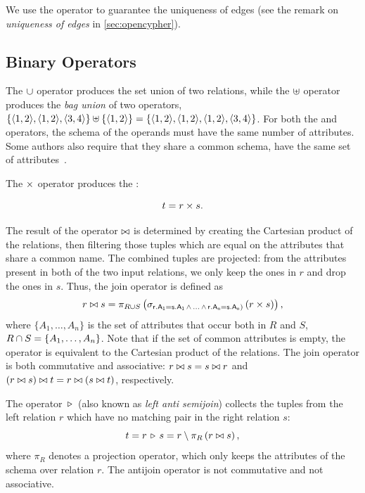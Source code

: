 We use the \alldifferenttext operator to guarantee the uniqueness of edges (see the remark on \emph{uniqueness of edges} in \autoref{sec:opencypher}).

\subsection{Binary Operators}
\label{sec:binary-operators}

The $\cup$ operator produces the set union of two relations, while the $\uplus$ operator produces the \emph{bag union} of two operators, \eg $\{\langle 1, 2 \rangle, \langle 1, 2 \rangle, \langle 3, 4 \rangle\} \uplus \{\langle 1, 2 \rangle\} = \{\langle 1, 2 \rangle, \langle 1, 2 \rangle, \langle 1, 2 \rangle, \langle 3, 4 \rangle\}$. For both the \uniontext and \baguniontext operators, the schema of the operands must have the same number of attributes. Some authors also require that they share a common schema, \ie have the same set of attributes~\cite{DBLP:books/daglib/0020812}.

The $\times$ operator produces the \cartesianproducttext:

$$ t = r \times s.$$

The result of the \jointext operator $\bowtie$ is determined by creating the Cartesian product of the relations, then filtering those tuples which are equal on the attributes that share a common name. The combined tuples are projected: from the attributes present in both of the two input relations, we only keep the ones in $r$ and drop the ones in $s$. Thus, the join operator is defined as
$$r \bowtie s = \pi_{R \cup S} \left(\sigma_{\mathsf{r.A_1 = s.A_1\,\land\,\ldots\,\land\,r.A_n = s.A_n)}} \left(r \times s\right) \right),$$
where $ \{ A_1, \ldots, A_n \} $ is the set of attributes that occur both in $R$ and $S$, \ie $ R \cap S = \{ A_1, \ldots, A_n \} $. Note that if the set of common attributes is empty, the \jointext operator is equivalent to the Cartesian product of the relations.
The join operator is both commutative and associative: $r \bowtie s = s \bowtie r$ and $(r \bowtie s) \bowtie t = r \bowtie (s \bowtie t)$, respectively.

The \antijointext operator $\, \triangleright \,$ (also known as \emph{left anti semijoin}) collects the tuples from the left relation $r$ which have no matching pair in the right relation $s$:
$$ t = r \, \triangleright \, s = r \setminus \pi_{R} \left(r \bowtie s\right), $$
where $\pi_{R}$ denotes a projection operator, which only keeps the attributes of the schema over relation $r$. The antijoin operator is not commutative and not associative.

